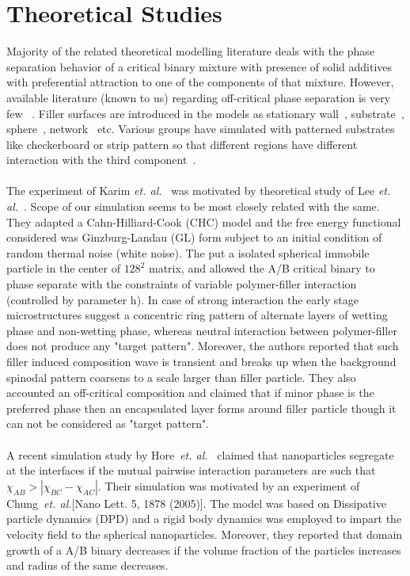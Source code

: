 \documentclass[12pt]{iiscthes}
\theoremstyle{definition}
\theoremstyle{definition}
\theoremstyle{remark}
\begin{document}
\section{Theoretical Studies}
Majority of the related theoretical modelling literature deals with the phase separation behavior of a critical binary mixture with presence of solid additives with preferential attraction to one of the components of that mixture. However, available literature (known to us) regarding off-critical phase separation is very few ~\cite{PBinder,Brown,Chakrabarti,Ma}. Filler surfaces are introduced in the models as stationary wall~\cite{Puri,Brown}, substrate~\cite{Puri}, sphere~\cite{Lee}, network~\cite{Chakrabarti} etc. Various groups have simulated with patterned substrates like checkerboard or strip pattern so that different regions have different interaction with the third component~\cite{Puri}. 
\\ \\
The experiment of Karim \emph{et. al.}~\cite{Karim} was motivated by theoretical study of  Lee \emph{et. al.}~\cite{Lee}. Scope of our simulation seems to be most closely related with the same. They adapted a Cahn-Hilliard-Cook (CHC) model and the free energy functional considered was Ginzburg-Landau (GL) form subject to an initial condition of random thermal noise (white noise). The put a isolated spherical immobile particle in the center of $ 128^2 $ matrix, and allowed the A/B critical binary to phase separate with the constraints of variable polymer-filler interaction (controlled by parameter h). In case of strong interaction the early stage microstructures suggest a concentric ring pattern of alternate layers of wetting phase and non-wetting phase, whereas neutral interaction between polymer-filler does not produce any "target pattern". Moreover, the authors reported that such filler induced composition wave is transient and breaks up when the background spinodal pattern coarsens to a scale larger than filler particle. They also accounted an off-critical composition and claimed that if minor phase is the preferred phase then an encapsulated layer forms around filler particle though it can not be considered as "target pattern".   
\\ \\
A recent simulation  study by Hore~\emph{et. al.}~\cite{Hore} claimed that nanoparticles segregate at the interfaces if the mutual pairwise interaction parameters are such that $\chi_{AB} > |\chi_{BC} - \chi_{AC}|$. Their simulation was motivated by an experiment of Chung~\emph{et. al.}[Nano Lett. 5, 1878 (2005)]. The model was based on Dissipative particle dynamics (DPD) and a rigid body dynamics was employed to impart the velocity field to the spherical nanoparticles. Moreover, they reported that domain growth of a A/B binary decreases if the volume fraction of the particles increases and radius of the same decreases.
\end{document}
